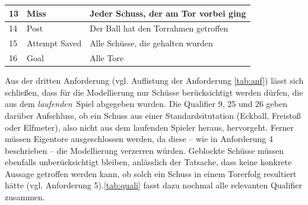 \tablelasttail{}
\begin{center}%
\begin{supertabular}{ | P{2cm} | P{3cm} | P{5cm} |}
\vspace*{1mm} 13 	& \vspace*{1mm}Miss  	& Jeder Schuss, der am Tor vorbei ging	\\
\hline
\vspace*{1mm}14	& \vspace*{1mm}Post	& Der Ball hat den Torrahmen getroffen 	\\
\hline
\vspace*{1mm}15	& \vspace*{1mm}Attempt Saved  	& Alle Schüsse, die gehalten wurden	\\
\hline
\vspace*{1mm}16\vspace*{1mm}	& \vspace*{1mm}Goal\vspace*{1mm}  	& \vspace*{1mm}Alle Tore\vspace*{1mm}	\\
\hline
\end{supertabular}
\end{center}

Aus der dritten Anforderung (vgl. Auflistung der Anforderung \vref{tab:anf}) lässt sich schließen, dass für die Modellierung nur Schüsse berücksichtigt werden dürfen, die aus dem \glqq \textit{laufenden}\grqq~Spiel abgegeben wurden. Die Qualifier \textsf{9, 25} und \textsf{26} geben darüber Aufschluss, ob ein Schuss aus einer Standardsitutation (Eckball, Freistoß oder Elfmeter), also nicht aus dem laufenden Spieler heraus, hervorgeht. Ferner müssen Eigentore ausgeschlossen werden, da diese -- wie in Anforderung 4 beschrieben -- die Modellierung verzerren würden. Geblockte Schüsse müssen ebenfalls unberücksichtigt bleiben, anlässlich der Tatsache, dass keine konkrete Aussage getroffen werden kann, ob solch ein Schuss in einem Torerfolg resultiert hätte (vgl. Anforderung 5).\vref{tab:quali} fasst dazu nochmal alle relevanten Qualifier zusammen.

